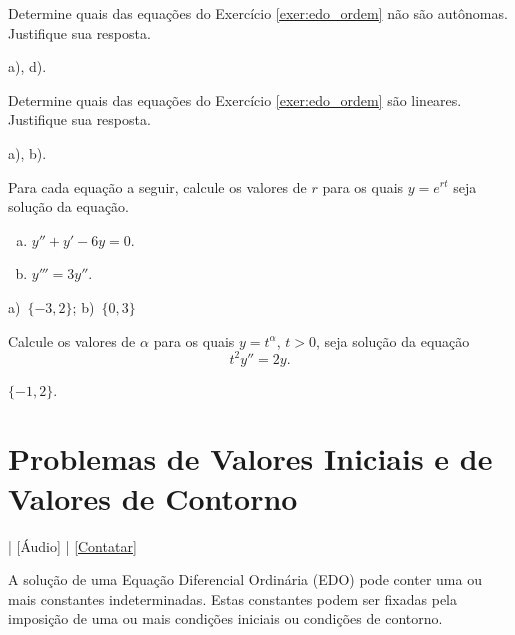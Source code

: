 \begin{exer}
  Determine quais das equações do Exercício \ref{exer:edo_ordem} não são autônomas. Justifique sua resposta.
\end{exer}
\begin{resp}
  a), d).
\end{resp}

\begin{exer}
  Determine quais das equações do Exercício \ref{exer:edo_ordem} são lineares. Justifique sua resposta.
\end{exer}
\begin{resp}
  a), b).
\end{resp}

\begin{exer}
  Para cada equação a seguir, calcule os valores de $r$ para os quais $y = e^{rt}$ seja solução da equação.
  \begin{enumerate}[a)]
  \item $y'' + y' - 6y = 0$.
  \item $y''' = 3y''$.
  \end{enumerate}
\end{exer}
\begin{resp}
  a)~$\{-3, 2\}$; b)~$\{0, 3\}$
\end{resp}

\begin{exer}
  Calcule os valores de $\alpha$ para os quais $y = t^\alpha$, $t>0$, seja solução da equação
  \begin{equation}
    t^2y'' = 2y.
  \end{equation}
\end{exer}
\begin{resp}
  $\{-1, 2\}$.
\end{resp}


\section{Problemas de Valores Iniciais e de Valores de Contorno}\label{cap_intro_sec_pv}

\begin{flushright}
  [Vídeo] | [Áudio] | \href{https://phkonzen.github.io/notas/contato.html}{[Contatar]}
\end{flushright}

A solução de uma Equação Diferencial Ordinária (EDO) pode conter uma ou mais constantes indeterminadas. Estas constantes podem ser fixadas pela imposição de uma ou mais condições iniciais ou condições de contorno.

